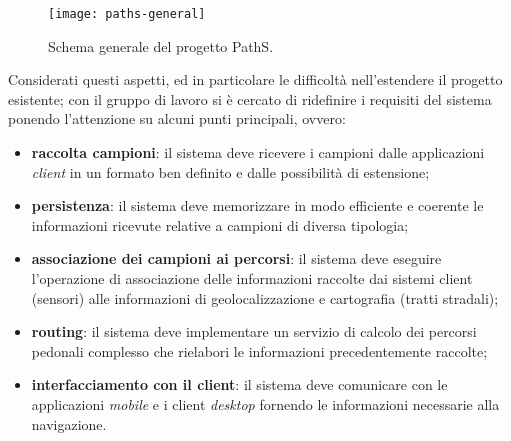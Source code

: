 \begin{figure}[ht]
  \centering
  \texttt{[image: paths-general]}
  \caption{\footnotesize{Schema generale del progetto PathS.}}
  \label{fig:paths-general}
\end{figure}

Considerati questi aspetti, ed in particolare le difficoltà nell'estendere il progetto esistente;  con il gruppo di lavoro si è cercato di ridefinire i requisiti del sistema ponendo l'attenzione su alcuni punti principali, ovvero:
\begin{itemize}
\item \textbf{raccolta campioni}: il sistema deve ricevere i campioni dalle applicazioni \emph{client} in un formato ben definito e dalle possibilità di estensione;
\item \textbf{persistenza}: il sistema deve memorizzare in modo efficiente e coerente le informazioni ricevute relative a campioni di diversa tipologia;
\item \textbf{associazione dei campioni ai percorsi}: il sistema deve eseguire l'operazione di associazione delle informazioni raccolte dai sistemi client (sensori) alle informazioni di geolocalizzazione e cartografia (tratti stradali);
\item \textbf{routing}: il sistema deve implementare un servizio di calcolo dei percorsi pedonali complesso che rielabori le informazioni precedentemente raccolte;
\item \textbf{interfacciamento con il client}: il sistema deve comunicare con le applicazioni \emph{mobile}  e i client \emph{desktop} fornendo le informazioni necessarie alla navigazione.
\end{itemize}

